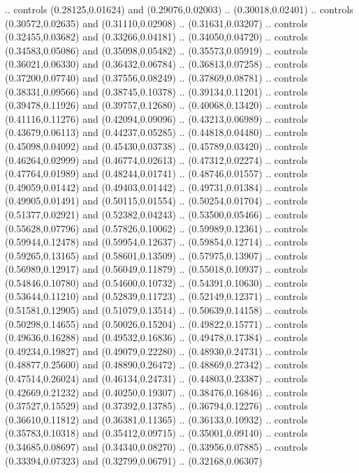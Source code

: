     .. controls (0.28125,0.01624) and (0.29076,0.02003) .. (0.30018,0.02401)
    .. controls (0.30572,0.02635) and (0.31110,0.02908) .. (0.31631,0.03207)
    .. controls (0.32455,0.03682) and (0.33266,0.04181) .. (0.34050,0.04720)
    .. controls (0.34583,0.05086) and (0.35098,0.05482) .. (0.35573,0.05919)
    .. controls (0.36021,0.06330) and (0.36432,0.06784) .. (0.36813,0.07258)
    .. controls (0.37200,0.07740) and (0.37556,0.08249) .. (0.37869,0.08781)
    .. controls (0.38331,0.09566) and (0.38745,0.10378) .. (0.39134,0.11201)
    .. controls (0.39478,0.11926) and (0.39757,0.12680) .. (0.40068,0.13420)
    .. controls (0.41116,0.11276) and (0.42094,0.09096) .. (0.43213,0.06989)
    .. controls (0.43679,0.06113) and (0.44237,0.05285) .. (0.44818,0.04480)
    .. controls (0.45098,0.04092) and (0.45430,0.03738) .. (0.45789,0.03420)
    .. controls (0.46264,0.02999) and (0.46774,0.02613) .. (0.47312,0.02274)
    .. controls (0.47764,0.01989) and (0.48244,0.01741) .. (0.48746,0.01557)
    .. controls (0.49059,0.01442) and (0.49403,0.01442) .. (0.49731,0.01384)
    .. controls (0.49905,0.01491) and (0.50115,0.01554) .. (0.50254,0.01704)
    .. controls (0.51377,0.02921) and (0.52382,0.04243) .. (0.53500,0.05466)
    .. controls (0.55628,0.07796) and (0.57826,0.10062) .. (0.59989,0.12361)
    .. controls (0.59944,0.12478) and (0.59954,0.12637) .. (0.59854,0.12714)
    .. controls (0.59265,0.13165) and (0.58601,0.13509) .. (0.57975,0.13907)
    .. controls (0.56989,0.12917) and (0.56049,0.11879) .. (0.55018,0.10937)
    .. controls (0.54846,0.10780) and (0.54600,0.10732) .. (0.54391,0.10630)
    .. controls (0.53644,0.11210) and (0.52839,0.11723) .. (0.52149,0.12371)
    .. controls (0.51581,0.12905) and (0.51079,0.13514) .. (0.50639,0.14158)
    .. controls (0.50298,0.14655) and (0.50026,0.15204) .. (0.49822,0.15771)
    .. controls (0.49636,0.16288) and (0.49532,0.16836) .. (0.49478,0.17384)
    .. controls (0.49234,0.19827) and (0.49079,0.22280) .. (0.48930,0.24731)
    .. controls (0.48877,0.25600) and (0.48890,0.26472) .. (0.48869,0.27342)
    .. controls (0.47514,0.26024) and (0.46134,0.24731) .. (0.44803,0.23387)
    .. controls (0.42669,0.21232) and (0.40250,0.19307) .. (0.38476,0.16846)
    .. controls (0.37527,0.15529) and (0.37392,0.13785) .. (0.36794,0.12276)
    .. controls (0.36610,0.11812) and (0.36381,0.11365) .. (0.36133,0.10932)
    .. controls (0.35783,0.10318) and (0.35412,0.09715) .. (0.35001,0.09140)
    .. controls (0.34685,0.08697) and (0.34340,0.08270) .. (0.33956,0.07885)
    .. controls (0.33394,0.07323) and (0.32799,0.06791) .. (0.32168,0.06307)
